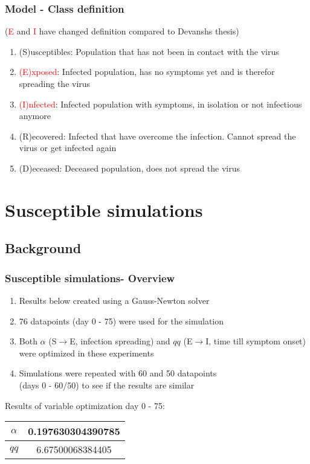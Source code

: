 \documentclass{beamer}
\begin{document}
\begin{frame}
	\frametitle{Model - Class definition}
	(\textcolor{red}{E} and \textcolor{red}{I} have changed definition compared to Devanshs thesis)\newline
	\begin{enumerate}[$\bullet$]
		\item (S)usceptibles: Population that has not been in contact with the virus
		\item \textcolor{red}{(E)xposed}: Infected population, has no symptoms yet and is therefor spreading the virus
		\item \textcolor{red}{(I)nfected}: Infected population with symptoms, in isolation or not infectious anymore
		\item (R)ecovered: Infected that have overcome the infection. Cannot spread the virus or get infected again
		\item (D)eceased: Deceased population, does not spread the virus
	\end{enumerate}

\end{frame}

\section{Susceptible simulations}
\subsection{Background}
\begin{frame}
	\frametitle{Susceptible simulations- Overview}
	\begin{enumerate}[$\bullet$]
		\item Results below created using a Gauss-Newton solver
		\item 76 datapoints (day 0 - 75) were used for the simulation
		\item Both $\alpha$ (S$\rightarrow$E, infection spreading) and $qq$ (E$\rightarrow$I, time till symptom onset) were optimized in these experiments
		\item Simulations were repeated with 60 and 50 datapoints\\(days 0 - 60/50) to see if the results are similar
	\end{enumerate}
	\vspace{0.5cm}
	Results of variable optimization day 0 - 75:
	\begin{center}
	\begin{tabular}{|c|c|}
		\hline $\alpha$ & 0.197630304390785 \\
		\hline $qq$ & 6.67500068384405 \\ \hline
	\end{tabular}
	\end{center}
\end{frame}
\end{document}
